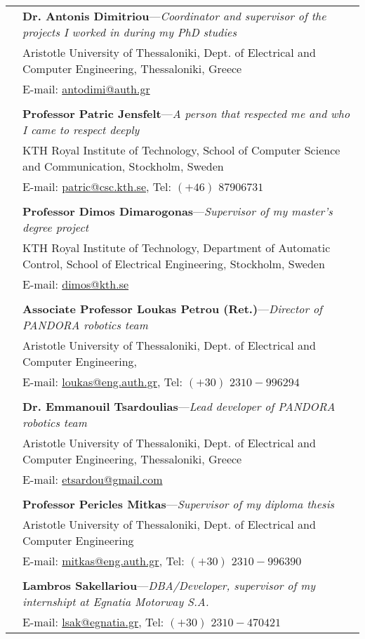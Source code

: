\documentclass[a4paper,10pt,twoside]{article}
\begin{document}
\begin{tabular}{rp{14cm}}
  & \textbf{Dr. Antonis Dimitriou}---\textit{Coordinator and supervisor of the projects I worked in during my PhD studies} \\
&Aristotle University of Thessaloniki, Dept. of Electrical and Computer Engineering, Thessaloniki, Greece \\
& E-mail: \href{mailto: antodimi@auth.gr}{antodimi@auth.gr} \\
&\\
  & \textbf{Professor Patric Jensfelt}---\textit{A person that respected me and who I came to respect deeply} \\
&KTH Royal Institute of Technology, School of Computer Science and Communication, Stockholm, Sweden \\
& E-mail: \href{mailto: patric@csc.kth.se}{patric@csc.kth.se}, Tel: $(+46)$ $8 790 67 31$ \\
&\\
  & \textbf{Professor Dimos Dimarogonas}---\textit{Supervisor of my master's degree project}\\
&KTH Royal Institute of Technology, Department of Automatic Control, School of Electrical Engineering, Stockholm, Sweden \\
& E-mail: \href{mailto: dimos@kth.se}{dimos@kth.se} \\
&\\
  & \textbf{Associate Professor Loukas Petrou (Ret.)}---\textit{Director of PANDORA robotics team}\\
&Aristotle University of Thessaloniki, Dept. of Electrical and Computer Engineering,\\
& E-mail: \href{mailto: loukas@eng.auth.gr}{loukas@eng.auth.gr}, Tel: $(+30)$ $2310-996294$ \\
&\\
& \textbf{Dr. Emmanouil Tsardoulias}---\textit{Lead developer of PANDORA robotics team}\\
&Aristotle University of Thessaloniki, Dept. of Electrical and Computer Engineering, Thessaloniki, Greece \\
& E-mail: \href{mailto: etsardou@gmail.com}{etsardou@gmail.com}\\
&\\
  & \textbf{Professor Pericles Mitkas}---\textit{Supervisor of my diploma thesis}\\
&Aristotle University of Thessaloniki, Dept. of Electrical and Computer Engineering\\
& E-mail: \href{mailto: mitkas@eng.auth.gr}{mitkas@eng.auth.gr}, Tel: $(+30)$ $2310-996390$ \\
&\\
& \textbf{Lambros Sakellariou}---\textit{DBA/Developer, supervisor of my internshipt at Egnatia Motorway S.A.}\\
& E-mail: \href{mailto: lsak@egnatia.gr}{lsak@egnatia.gr}, Tel: $(+30)$ $2310 - 470421$ \\

\end{tabular}
\end{document}

